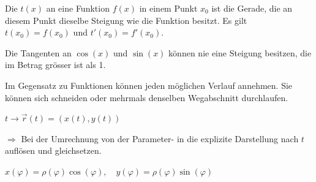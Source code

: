 

Die  $t(x)$ an eine Funktion $f(x)$ in einem Punkt $x_0$ ist die Gerade, die an diesem Punkt dieselbe Steigung wie die Funktion besitzt. Es gilt $t(x_0) = f(x_0)$ und $t'(x_0) = f'(x_0)$.\par
Die Tangenten an $\cos(x)$ und $\sin(x)$ können nie eine Steigung besitzen, die im Betrag grösser ist als 1.


Im Gegensatz zu Funktionen können  jeden möglichen Verlauf annehmen. Sie können sich schneiden oder mehrmals denselben Wegabschnitt durchlaufen.\par
{}

\begin{formulabox}
    $\displaystyle t \to \vec{r}(t) = (x(t), y(t))$
\end{formulabox}

\begin{factlist}
\end{factlist}

$\Rightarrow$ Bei der Umrechnung von der Parameter- in die explizite Darstellung nach $t$ auflösen und gleichsetzen.


\begin{formulabox}
    $\displaystyle x(\varphi) = \rho(\varphi)\cos(\varphi), \quad y(\varphi) = \rho(\varphi)\sin(\varphi)$
\end{formulabox}


